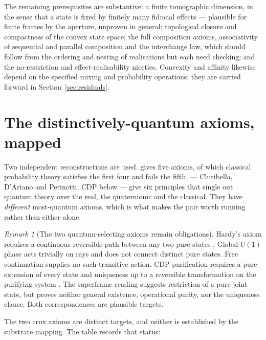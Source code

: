 \documentclass[11pt,a4paper]{article}
\theoremstyle{remark}\newtheorem{remark}[definition]{Remark}
\begin{document}
The remaining prerequisites are substantive: a finite tomographic
dimension, in the sense that a state is fixed by finitely many fiducial effects
--- plausible for finite frames by the aperture, unproven in general;
topological closure and compactness of the convex state space; the full
composition axioms, associativity of sequential and parallel composition and the
interchange law, which should follow from the ordering and nesting of realisations
but each need checking; and the no-restriction and effect-realisability
niceties. Convexity and affinity likewise depend on the specified mixing and probability operations; they are carried forward in
Section~\ref{sec:residuals}.

\section{The distinctively-quantum axioms, mapped}\label{sec:axioms}
Two independent reconstructions are used. \citet{hardy2001} gives five axioms, of
which classical probability theory satisfies the first four and fails the fifth.
\citet{chiribella2011} --- Chiribella, D'Ariano and Perinotti, CDP below --- give
six principles that single out quantum theory over the real, the quaternionic and
the classical. They have \emph{different} most-quantum axioms, which is what makes
the pair worth running rather than either alone.

\begin{remark}[The two quantum-selecting axioms remain obligations]\label{prop:crux}
Hardy's axiom requires a continuous reversible path between any two pure
states \citep{hardy2001}. Global $U(1)$ phase acts trivially on rays and
does not connect distinct pure states. Free continuation supplies no such
transitive action. CDP purification requires a pure extension of every state
and uniqueness up to a reversible transformation on the purifying system
\citep{chiribella2011}. The superframe reading suggests restriction of a
pure joint state, but proves neither general existence, operational purity,
nor the uniqueness clause. Both correspondences are plausible targets.
\end{remark}

The two crux axioms are distinct targets, and neither is established by the substrate mapping. The table records that status:
\end{document}
